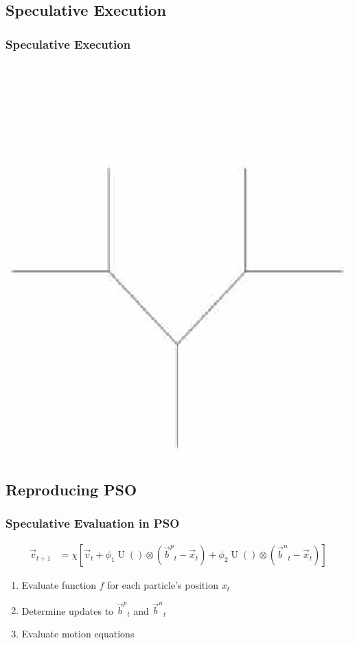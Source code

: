 \documentclass{beamer}
\DeclareMathOperator{\URand}{U}
\providecommand{\ppos}{\ensuremath{\Vec{x}}}
\providecommand{\pvel}{\ensuremath{\Vec{v}}}
\providecommand{\nbest}{\ensuremath{\Vec{b}^n}}
\providecommand{\pbest}{\ensuremath{\Vec{b}^p}}
\providecommand{\constriction}{\ensuremath{\chi}}
\providecommand{\coeff}{\ensuremath{\phi}}
\begin{document}
\subsection{Speculative Execution}
\begin{frame}
  \frametitle{Speculative Execution}
  \begin{center}
	\includegraphics[height=.7\textheight]{branching}
  \end{center}
\end{frame}

\subsection{Reproducing PSO}

\begin{frame}
  \frametitle{Speculative Evaluation in PSO}
  \begin{align*}
	  \pvel_{t+1} &=
		  \constriction \left[ \pvel_t +
			  \coeff_1\URand()\otimes(\pbest_t - \ppos_t) +
			  \coeff_2\URand()\otimes(\nbest_t - \ppos_t)
		  \right]
  \end{align*}
  \begin{enumerate}
	\item Evaluate function $f$ for each particle's position $x_t$
	\item Determine updates to $\pbest_t$ and $\nbest_t$
	\item Evaluate motion equations
  \end{enumerate}
\end{frame}
\end{document}

